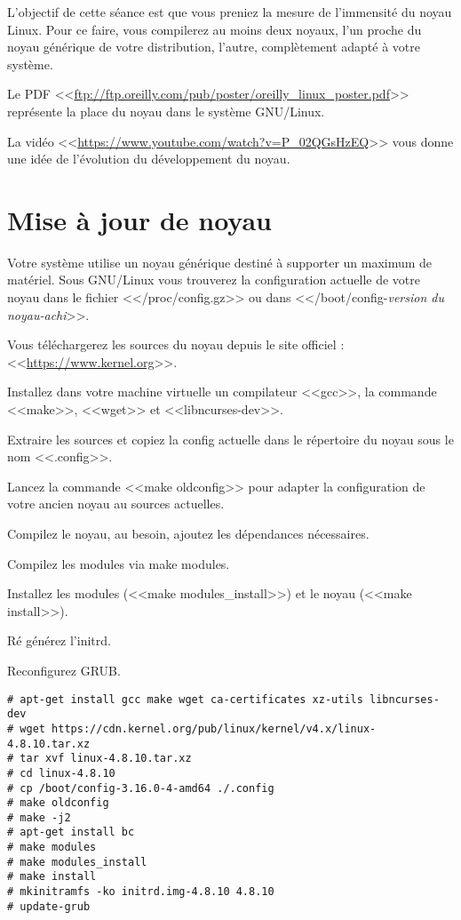\documentclass[11pt]{article}
\newcommand{\numtd}{08}
\newcommand{\titretd}{Le noyau Linux}
\begin{document}
\entete{\numtd}{\titretd}

\begin{introduction}
L'objectif de cette séance est que vous preniez la mesure de l'immensité du noyau Linux. Pour ce faire, vous compilerez au moins deux noyaux, l'un proche du noyau générique de votre distribution, l'autre, complètement adapté à votre système.

Le PDF <<\url{ftp://ftp.oreilly.com/pub/poster/oreilly_linux_poster.pdf}>> représente la place du noyau dans le système GNU/Linux.

La vidéo <<\url{https://www.youtube.com/watch?v=P_02QGsHzEQ}>> vous donne une idée de l'évolution du développement du noyau.
\end{introduction}

\section{Mise à jour de noyau}

Votre système utilise un noyau générique destiné à supporter un maximum de matériel. Sous GNU/Linux vous trouverez la configuration actuelle de votre noyau dans le fichier <</proc/config.gz>> ou dans <</boot/config-\textit{version du noyau-achi}>>.

Vous téléchargerez les sources du noyau depuis le site officiel : <<\url{https://www.kernel.org}>>.

Installez dans votre machine virtuelle un compilateur <<gcc>>, la commande <<make>>, <<wget>> et <<libncurses-dev>>.

Extraire les sources et copiez la config actuelle dans le répertoire du noyau sous le nom <<.config>>.

Lancez la commande <<make oldconfig>> pour adapter la configuration de votre ancien noyau au sources actuelles.

Compilez le noyau, au besoin, ajoutez les dépendances nécessaires.

Compilez les modules via make modules.

Installez les modules (<<make modules\_install>>) et le noyau (<<make install>>).

Ré générez l'initrd.

Reconfigurez GRUB.

\begin{solution}
\begin{lstlisting}
# apt-get install gcc make wget ca-certificates xz-utils libncurses-dev
# wget https://cdn.kernel.org/pub/linux/kernel/v4.x/linux-4.8.10.tar.xz
# tar xvf linux-4.8.10.tar.xz
# cd linux-4.8.10
# cp /boot/config-3.16.0-4-amd64 ./.config
# make oldconfig
# make -j2
# apt-get install bc
# make modules
# make modules_install
# make install
# mkinitramfs -ko initrd.img-4.8.10 4.8.10
# update-grub
\end{lstlisting}
\end{solution}
\end{document}
